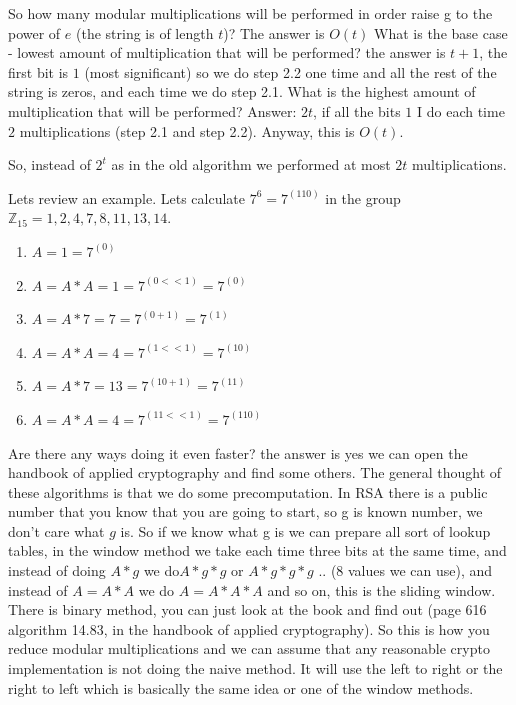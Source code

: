 So how many modular multiplications will be performed in order raise g to the
power of $e$ (the string is of length $t$)? The answer is \(O(t)\) What is the
base case - lowest amount of multiplication that will be performed? the answer
is $t+1$, the first bit is $1$ (most significant) so we do step 2.2 one time and
all the rest of the string is zeros, and each time we do step 2.1. What is the
highest amount of multiplication that will be performed? Answer: $2t$, if all
the bits $1$ I do each time $2$ multiplications (step 2.1 and step 2.2). Anyway,
this is \(O(t)\).

So, instead of \(2^t\) as in the old algorithm we performed at most $2t$
multiplications. 

Lets review an example. Lets calculate \(7^6=7^{(110)}\) in the group \(
\mathbb{Z}_{15}={1, 2, 4 ,7, 8, 11, 13, 14} \).

\begin{enumerate}
	\item  \(A = 1 = 7^(0) \)
	\item  \(A = A*A = 1 = 7^{(0<<1)} = 7^{(0)}\)
	\item  \(A = A*7 = 7 = 7^{(0+1)} = 7^{(1)}\)
	\item  \(A = A*A = 4 = 7^{(1<<1)} = 7^{(10)} \)
	\item  \(A = A*7 = 13 = 7^{(10+1)} = 7^{(11)} \)
	\item  \( A = A*A = 4 = 7^{(11<<1)} = 7^{(110)} \)
\end{enumerate}

Are there any ways doing it even faster? the answer is yes we can open the
handbook of applied cryptography and find some others. The general thought of
these algorithms is that we do some precomputation. In RSA there is a public
number that you know that you are going to start, so g is known number, we don't
care what $g$ is. So if we know what g is we can prepare all sort of lookup
tables, in the window method we take each time three bits at the same time, and
instead of doing \(A*g\) we do\( A*g*g\) or \(A*g*g*g\) .. (8 values we can
use), and instead of \( A=A*A\) we do \(A=A*A*A\) and so on, this is the sliding
window. There is binary method, you can just look at the book and find out (page
616 algorithm 14.83, in the handbook of applied cryptography). So this is how
you reduce modular multiplications and we can assume that any reasonable crypto
implementation is not doing the naive method. It will use the left to right or
the right to left which is basically the same idea or one of the window methods.

